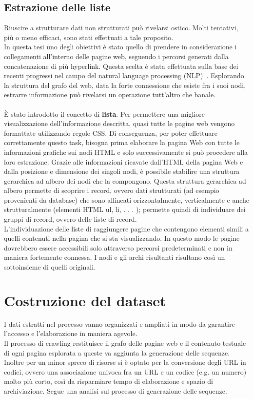 \subsection{Estrazione delle liste}
Riuscire a strutturare dati non strutturati può rivelarsi ostico. Molti tentativi, più o meno efficaci, sono stati effettuati a tale proposito.
\\
In questa tesi uno degli obiettivi è stato quello di prendere in considerazione i collegamenti all'interno delle pagine web, seguendo i percorsi generati dalla concatenazione di più hyperlink. Questa scelta è stata effettuata sulla base dei recenti progressi nel campo del natural language processing (NLP)~\cite{Turian10}. Esplorando la struttura del grafo del web, data la forte connessione che esiste fra i suoi nodi, estrarre informazione può rivelarsi un operazione tutt'altro che banale. 
\\\\
È stato introdotto il concetto di \textbf{lista}. 
Per permettere una migliore visualizzazione dell’informazione descritta, quasi tutte le pagine web vengono formattate utilizzando regole CSS. Di conseguenza, per poter effettuare correttamente questo task, bisogna prima elaborare la pagina Web con tutte le informazioni grafiche sui nodi HTML e solo successivamente si può procedere alla loro estrazione. Grazie alle informazioni ricavate dall’HTML della pagina Web e dalla posizione e dimensione dei singoli nodi, è possibile stabilire una struttura gerarchica ad albero dei nodi che la compongono. Questa struttura gerarchica ad albero permette di scoprire i record, ovvero dati strutturati (ad esempio provenienti da database) che sono allineati orizzontalmente, verticalmente e anche strutturalmente (elementi HTML ul, li, . . . ); permette quindi di individuare dei gruppi di record, ovvero delle liste di record.
\\
L’individuazione delle liste di raggiungere pagine che contengono elementi simili a quelli contenuti nella pagina che si sta visualizzando. 
In questo modo le pagine dovrebbero essere accessibili solo attraverso percorsi predeterminati e non in maniera fortemente connessa. I nodi e gli archi risultanti risultano così un sottoinsieme di quelli originali.

\section{Costruzione del dataset}
I dati estratti nel processo vanno organizzati e ampliati in modo da garantire l'accesso e l'elaborazione in maniera agevole.
\\
Il processo di crawling restituisce il grafo delle pagine web e il contenuto testuale di ogni pagina esplorata a queste va aggiunta la generazione delle sequenze. Inoltre per un minor spreco di risorse si è optato per la conversione degli URL in codici, ovvero una associazione univoca fra un URL e un codice (e.g. un numero) molto più corto, così da risparmiare tempo di elaborazione e spazio di archiviazione. Segue una analisi sul processo di generazione delle sequenze.


